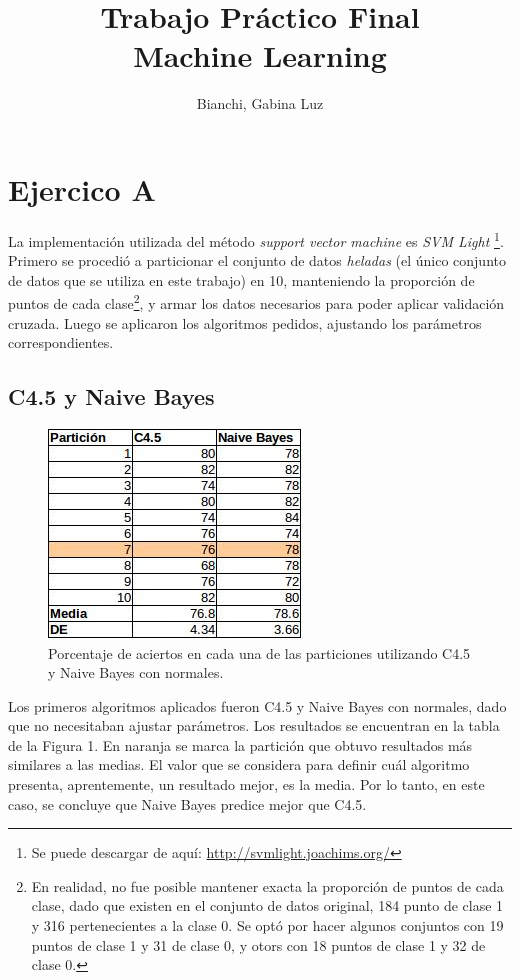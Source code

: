 \documentclass[12pt, a4paper]{article}
\begin{document}
 
\title{Trabajo Práctico Final\\ Machine Learning} 
\author{Bianchi, Gabina Luz} 
\maketitle

\section*{Ejercico A}
La implementación utilizada del método \textit{support vector machine} es \textit{SVM Light} \footnote{Se puede descargar de aquí: \url{http://svmlight.joachims.org/}}. \\
Primero se procedió a particionar el conjunto de datos \textit{heladas} (el único conjunto de datos que se utiliza en este trabajo) en 10, manteniendo la proporción de puntos de cada clase\footnote{En realidad, no fue posible mantener exacta la proporción de puntos de cada clase, dado que existen en el conjunto de datos original, 184 punto de clase 1 y 316 pertenecientes a la clase 0. Se optó por hacer algunos conjuntos con 19 puntos de clase 1 y 31 de clase 0, y otors con 18 puntos de clase 1 y 32 de clase 0.}, y armar los datos necesarios para poder aplicar validación cruzada. Luego se aplicaron los algoritmos pedidos, ajustando los parámetros correspondientes. 
\subsection*{C4.5 y Naive Bayes}

\begin{figure}
    \centering
	\includegraphics[scale=0.8]{tabla1}
	\caption{Porcentaje de aciertos en cada una de las particiones utilizando C4.5 y Naive Bayes con normales.}
\end{figure}


Los primeros algoritmos aplicados fueron C4.5 y Naive Bayes con normales, dado que no necesitaban ajustar parámetros.  Los resultados se encuentran en la tabla de la Figura 1. En naranja se marca la partición que obtuvo resultados más similares a las medias. El valor que se considera para definir cuál algoritmo presenta, aprentemente, un resultado mejor, es la media. Por lo tanto, en este caso, se concluye que Naive Bayes predice mejor que C4.5.
\end{document}
